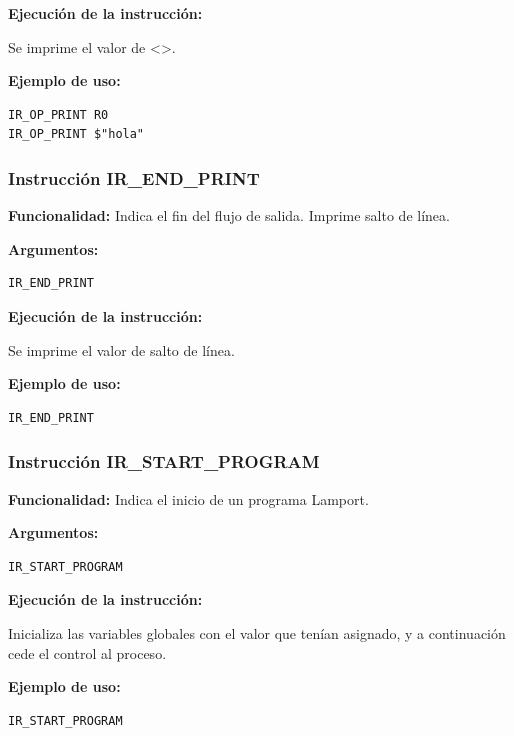 \noindent
\textbf{Ejecución de la instrucción:}
\vspace{0.3cm}

\noindent
Se imprime el valor de <>.
\vspace{0.3cm}

\noindent
\textbf{Ejemplo de uso:}
\begin{verbatim}
IR_OP_PRINT R0
IR_OP_PRINT $"hola"
\end{verbatim}

\subsubsection{Instrucción IR\_END\_PRINT}\label{subsubsec:IR_END_PRINT}
\noindent
\textbf{Funcionalidad:} Indica el fin del flujo de salida. Imprime salto de línea.

\noindent
\textbf{Argumentos:}
\begin{verbatim}
IR_END_PRINT
\end{verbatim}

\noindent
\textbf{Ejecución de la instrucción:}
\vspace{0.3cm}

\noindent
Se imprime el valor de salto de línea.
\vspace{0.3cm}

\noindent
\textbf{Ejemplo de uso:}
\begin{verbatim}
IR_END_PRINT
\end{verbatim}

\subsubsection{Instrucción IR\_START\_PROGRAM}\label{subsubsec:IR_START_PROGRAM}
\noindent
\textbf{Funcionalidad:} Indica el inicio de un programa Lamport.

\noindent
\textbf{Argumentos:}
\begin{verbatim}
IR_START_PROGRAM
\end{verbatim}

\noindent
\textbf{Ejecución de la instrucción:}
\vspace{0.3cm}

\noindent
Inicializa las variables globales con el valor que tenían asignado, y a continuación cede el control al proceso.
\vspace{0.3cm}

\noindent
\textbf{Ejemplo de uso:}
\begin{verbatim}
IR_START_PROGRAM
\end{verbatim}

